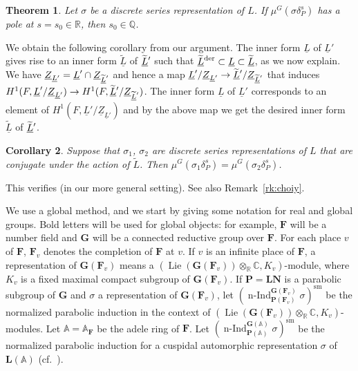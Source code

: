 \documentclass[a4paper]{amsart}
\numberwithin{equation}{section}
\newtheorem{thm}{Theorem}[section]
\newtheorem{cor}[thm]{Corollary}
\theoremstyle{remark}
\theoremstyle{definition}
\DeclareMathOperator{\nInd}{n-Ind}
\DeclareMathOperator{\Lie}{Lie}
\newcommand{\C}{\mathbb{C}}
\newcommand{\Q}{\mathbb{Q}}
\newcommand{\R}{\mathbb{R}}
\newcommand{\sm}{\mathrm{sm}}
\newcommand{\alggrp}[1]{\underline{#1}}
\newcommand{\der}{\mathrm{der}}
\newcommand{\glob}[1]{\boldsymbol{#1}}
\newcommand{\lowprime}[1][\prime]{
  \mathchoice
    {\raisebox{-0.7ex}{$\scriptstyle #1$}}
    {\raisebox{-0.7ex}{$\scriptstyle #1$}}
    {\raisebox{-0.7ex}{$\scriptstyle #1$}}
    {\raisebox{-0.3ex}{$\scriptscriptstyle #1$}}
}
\begin{document}
\begin{thm}\label{thm:rationality, inner}
Let $\sigma$ be a discrete series representation of $L$.
If $\mu^G(\sigma\delta_{P}^{s})$ has a pole at $s = s_{0}\in \R$, then $s_{0}\in \Q$.
\end{thm}

We obtain the following corollary from our argument.
The inner form $\alggrp L$ of $\alggrp{L}'$ gives rise to an inner form $\widetilde{\alggrp{L}}$ of $\widetilde{\alggrp{L}}^{\lowprime}$ such that $\widetilde{\alggrp{L}}^{\lowprime[\der]} \subset \alggrp{L} \subset \widetilde{\alggrp{L}}$, as we now explain.
We have $\alggrp{Z}_{\alggrp{L}'} = \alggrp{L}'\cap \alggrp{Z}_{\widetilde{\alggrp{L}}^{\lowprime}}$ and hence a map $\alggrp{L}'/\alggrp{Z}_{\alggrp{L}'}\to \widetilde{\alggrp{L}}^{\lowprime}/\alggrp{Z}_{\widetilde{\alggrp{L}}^{\lowprime}}$ that induces $H^{1}(F,\alggrp{L}'/\alggrp{Z}_{\alggrp{L}'})\to H^{1}(F,\widetilde{\alggrp{L}}^{\lowprime}/\alggrp{Z}_{\widetilde{\alggrp{L}}^{\lowprime}})$.
The inner form $\alggrp{L}$ of $\alggrp{L}'$ corresponds to an element of $H^{1}(F,\alggrp{L}'/\alggrp{Z}_{\alggrp{L}'})$ and by the above map we get the desired 
inner form $\widetilde{\alggrp{L}}$ of $\widetilde{\alggrp{L}}^{\lowprime}$.

\begin{cor}\label{cor:rationality, inner}
  Suppose that $\sigma_1$, $\sigma_2$ are discrete series representations of $L$ that are conjugate under the action of $\widetilde{L}$.
  Then $\mu^G(\sigma_1\delta_{P}^{s}) = \mu^G(\sigma_2\delta_{P}^{s})$.
\end{cor}

This verifies \cite[Working Hypothesis 1.1]{MR3194161} (in our more general setting).
See also Remark~\ref{rk:choiy}.

We use a global method, and we start by giving some notation for real and global groups.
Bold letters will be used for global objects: for example, $\glob{F}$ will be a number field and $\glob{G}$ will be a connected reductive group over $\glob{F}$.
For each place $v$ of $\glob{F}$, $\glob{F}_{v}$ denotes the completion of $\glob{F}$ at $v$.
If $v$ is an infinite place of $\glob{F}$, a representation of $\glob{G}(\glob{F}_{v})$ means a $(\Lie(\glob{G}(\glob{F}_{v}))\otimes_{\R}\C,K_{v})$-module, where $K_{v}$ is a fixed maximal compact subgroup of $\glob{G}(\glob{F}_{v})$.
If $\glob{P} = \glob{L}\glob{N}$ is a parabolic subgroup of $\glob{G}$ and $\sigma$ a representation of $\glob{G}(\glob{F}_{v})$, let $(\nInd_{\glob{P}(\glob{F}_{v})}^{\glob{G}(\glob{F}_{v})}\sigma)^{\sm}$ be the normalized parabolic induction in the context of $(\Lie(\glob{G}(\glob{F}_{v}))\otimes_{\R}\C,K_{v})$-modules.
Let $\mathbb{A} = \mathbb{A}_{\glob{F}}$ be the adele ring of $\glob{F}$.
Let $(\nInd_{\glob{P}(\mathbb{A})}^{\glob{G}(\mathbb{A})}\sigma)^{\sm}$ be the normalized parabolic induction for a cuspidal automorphic representation $\sigma$ of $\glob{L}(\mathbb{A})$ (cf.\ \cite[II.1]{MR1361168}).
\end{document}
